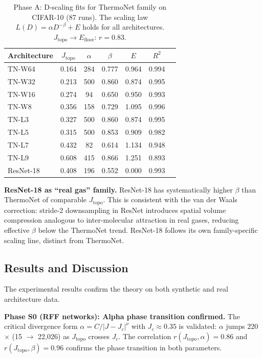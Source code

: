 \documentclass[11pt, a4paper]{article}
\theoremstyle{definition}
\begin{document}
\begin{table}[htbp]
\centering
\caption{Phase A: D-scaling fits for ThermoNet family on CIFAR-10 (87 runs). The scaling law $L(D) = \alpha D^{-\beta} + E$ holds for all architectures. $J_\mathrm{topo} \to E_\mathrm{floor}$: $r = 0.83$.}
\label{tab:phase-a-results}
\begin{tabular}{lcccccc}
\toprule
\textbf{Architecture} & $J_\mathrm{topo}$ & $\alpha$ & $\beta$ & $E$ & $R^2$ \\
\midrule
TN-W64  & 0.164 & 284 & 0.777 & 0.964 & 0.994 \\
TN-W32  & 0.213 & 500 & 0.860 & 0.874 & 0.995 \\
TN-W16  & 0.274 & 94  & 0.650 & 0.950 & 0.993 \\
TN-W8   & 0.356 & 158 & 0.729 & 1.095 & 0.996 \\
TN-L3   & 0.327 & 500 & 0.860 & 0.874 & 0.995 \\
TN-L5   & 0.315 & 500 & 0.853 & 0.909 & 0.982 \\
TN-L7   & 0.432 & 82  & 0.614 & 1.134 & 0.948 \\
TN-L9   & 0.608 & 415 & 0.866 & 1.251 & 0.893 \\
ResNet-18 & 0.408 & 196 & 0.552 & 0.000 & 0.993 \\
\bottomrule
\end{tabular}
\end{table}

\textbf{ResNet-18 as ``real gas'' family.} ResNet-18 has systematically higher $\beta$ than ThermoNet of comparable $J_\mathrm{topo}$. This is consistent with the van der Waals correction: stride-2 downsampling in ResNet introduces spatial volume compression analogous to inter-molecular attraction in real gases, reducing effective $\beta$ below the ThermoNet trend. ResNet-18 follows its own family-specific scaling line, distinct from ThermoNet.
\subsection{Results and Discussion}
\label{sec:results}
The experimental results confirm the theory on both synthetic and real architecture data.

\textbf{Phase S0 (RFF networks): Alpha phase transition confirmed.} The critical divergence form $\alpha = C/|J - J_c|^\nu$ with $J_c \approx 0.35$ is validated: $\alpha$ jumps 220$\times$ (15 $\to$ 22,026) as $J_\mathrm{topo}$ crosses $J_c$. The correlation $r(J_\mathrm{topo}, \alpha) = 0.86$ and $r(J_\mathrm{topo}, \beta) = 0.96$ confirms the phase transition in both parameters.
\end{document}
